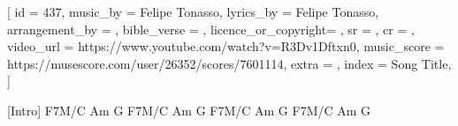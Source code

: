 [
    id                  = {437},
    music_by            = {Felipe Tonasso}, %
    lyrics_by           = {Felipe Tonasso}, %
    arrangement_by      = {}, %
    bible_verse         = {},
    licence_or_copyright= {},
    sr                  = {},
    cr                  = {},
    video_url           = {https://www.youtube.com/watch?v=R3Dv1Dftxn0}, %
    music_score         = {https://musescore.com/user/26352/scores/7601114},
    extra               = {},
    index               = {Song Title},
]

\beginverse

[Intro] F7M/C  Am  G
        F7M/C  Am  G
        F7M/C  Am  G
        F7M/C  Am  G

